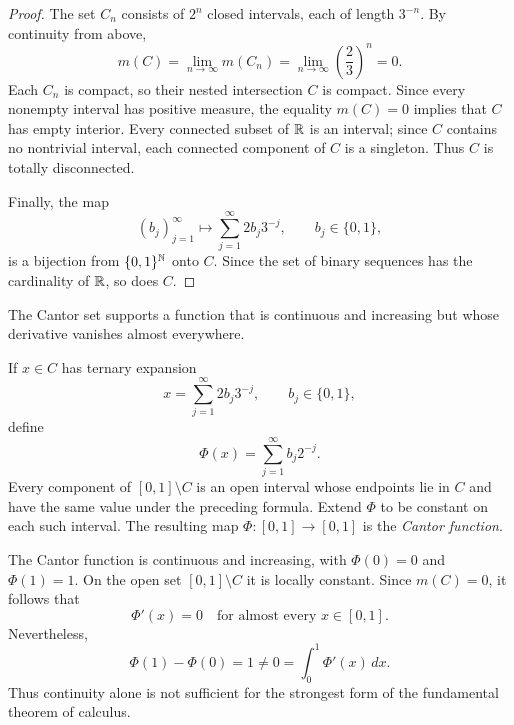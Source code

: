 \begin{proof}
  The set $C_n$ consists of $2^n$ closed intervals, each of length
  $3^{-n}$. By continuity from above,
  \[
    m(C)=\lim_{n\to\infty}m(C_n)
    =\lim_{n\to\infty}\left(\frac23\right)^n=0.
  \]
  Each $C_n$ is compact, so their nested intersection $C$ is compact.
  Since every nonempty interval has positive measure, the equality
  $m(C)=0$ implies that $C$ has empty interior. Every connected subset
  of $\mathbb{R}$ is an interval; since $C$ contains no nontrivial interval,
  each connected component of $C$ is a singleton. Thus $C$ is totally
  disconnected.

  Finally, the map
  \[
    (b_j)_{j=1}^{\infty}
    \longmapsto
    \sum_{j=1}^{\infty}2b_j3^{-j},
    \qquad b_j\in\{0,1\},
  \]
  is a bijection from $\{0,1\}^{\mathbb{N}}$ onto $C$. Since the set of
  binary sequences has the cardinality of $\mathbb{R}$, so does $C$.
\end{proof}

The Cantor set supports a function that is continuous and increasing but
whose derivative vanishes almost everywhere.

\begin{definition}
  If $x\in C$ has ternary expansion
  \[
    x=\sum_{j=1}^{\infty}2b_j3^{-j},
    \qquad b_j\in\{0,1\},
  \]
  define
  \[
    \Phi(x)=\sum_{j=1}^{\infty}b_j2^{-j}.
  \]
  Every component of $[0,1]\setminus C$ is an open interval whose
  endpoints lie in $C$ and have the same value under the preceding
  formula. Extend $\Phi$ to be constant on each such interval. The
  resulting map $\Phi\colon[0,1]\to[0,1]$ is the \emph{Cantor function}.
\end{definition}

The Cantor function is continuous and increasing, with
$\Phi(0)=0$ and $\Phi(1)=1$. On the open set $[0,1]\setminus C$ it is
locally constant. Since $m(C)=0$, it follows that
\[
  \Phi'(x)=0\quad\text{for almost every }x\in[0,1].
\]
Nevertheless,
\[
  \Phi(1)-\Phi(0)=1
  \neq0=\int_0^1\Phi'(x)\,dx.
\]
Thus continuity alone is not sufficient for the strongest form of the
fundamental theorem of calculus.

